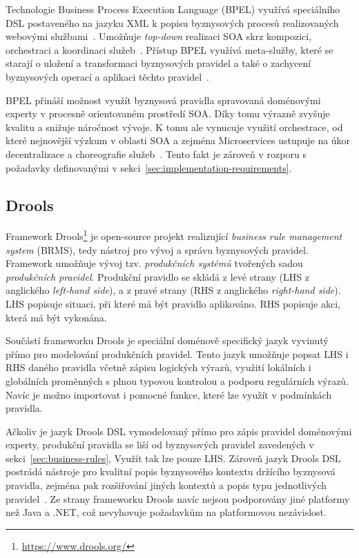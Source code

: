 Technologie Business Process Execution Language (\gls{BPEL}) využívá speciálního \gls{DSL}
postaveného na jazyku \gls{XML} k popisu byznysových procesů realizovaných webovými
službami~\cite{andrews2003business}. Umožňuje \textit{top-down} realizaci \gls{SOA}
skrz kompozici, orchestraci a koordinaci služeb~\cite{oraclebpel}.
Přístup \gls{BPEL} využívá meta-služby, které se starají o uložení a transformaci byznysových pravidel
a také o zachycení byznysových operací a aplikaci těchto pravidel~\cite{rosenberg2005business}.

\gls{BPEL} přináší možnost využít byznysová pravidla spravovaná doménovými experty
v procesně orientovaném prostředí \gls{SOA}. Díky tomu výrazně zvyšuje kvalitu a snižuje
náročnost vývoje. K tomu ale vynucuje využití orchestrace, od které nejnovější výzkum v oblasti \gls{SOA}
a zejména Microservices ustupuje na úkor decentralizace a choreografie
služeb~\cite{bakshi2017microservices, cerny2018contextual}. Tento fakt je zároveň
v rozporu s požadavky definovanými v sekci~\ref{sec:implementation-requirements}.

\subsection{Drools}\label{sec:drools}

Framework Drools\footnote{\url{https://www.drools.org/}} je open-source projekt realizující
\textit{business rule management system} (\gls{BRMS}), tedy nástroj pro vývoj a správu byznysových
pravidel. Framework umožňuje vývoj tzv. \textit{produkčních systémů} tvořených sadou \textit{produkčních pravidel}.
Produkční pravidlo se skládá z levé strany (\gls{LHS} z anglického \textit{left-hand side}),
a z pravé strany (\gls{RHS} z anglického \textit{right-hand side}).
\gls{LHS} popisuje situaci, při které má být pravidlo aplikováno. \gls{RHS} popisuje akci,
která má být vykonána.

Součástí frameworku Drools je speciální doménově specifický jazyk vyvinutý přímo
pro modelování produkčních pravidel. Tento jazyk umožňuje popsat \gls{LHS} i \gls{RHS}
daného pravidla včetně zápisu logických výrazů, využití lokálních i globálních proměnných
s plnou typovou kontrolou a podporu regulárních výrazů. Navíc je možno importovat i pomocné funkce, které lze
využít v podmínkách pravidla.

Ačkoliv je jazyk Drools \gls{DSL} vymodelovaný přímo pro zápis pravidel doménovými experty,
produkční pravidla se liší od byznysových pravidel zavedených v sekci~\ref{sec:business-rules},
Využít tak lze pouze \gls{LHS}. Zároveň jazyk Drools \gls{DSL} postrádá
nástroje pro kvalitní popis byznysového kontextu držícího byznysová pravidla,
zejména pak rozšiřování jiných kontextů a popis typu jednotlivých pravidel~\cite{cemus2017automated}.
Ze strany frameworku Drools navíc nejsou podporovány jiné platformy než Java a .NET, což nevyhovuje
požadavkům na platformovou nezávislost.

